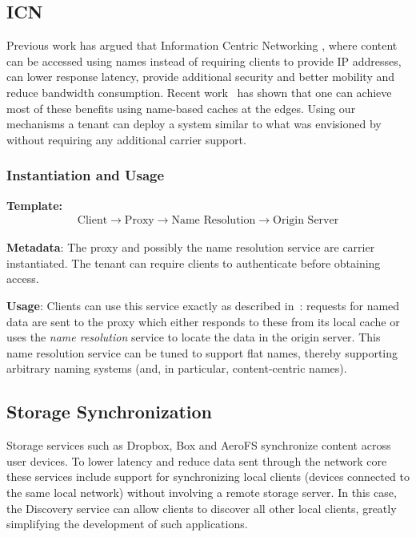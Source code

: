 \subsection{ICN}

Previous work has argued that Information Centric Networking \cite{ccn,dona}, where content can be accessed using names instead of requiring clients to provide IP addresses, can lower response latency, provide additional security and better mobility and reduce bandwidth consumption. Recent work~\cite{fayazbakhsh2013less} has shown that one can achieve most of these benefits using name-based caches at the edges. Using our mechanisms a tenant can deploy a system similar to what was envisioned by~\cite{fayazbakhsh2013less} without requiring any additional carrier support.

\subsubsection*{Instantiation and Usage}
\indent\indent\textbf{Template:} 
\begin{align*}
\text{Client} \rightarrow \text{Proxy} \rightarrow \text{Name Resolution} \rightarrow \text{Origin Server}
\end{align*}

\textbf{Metadata}: The proxy and possibly the name resolution service are carrier instantiated. The tenant can require clients to authenticate before obtaining access.

\textbf{Usage}: Clients can use this service exactly as described in~\cite{fayazbakhsh2013less}: requests for named data are sent to the proxy which either responds to these from its local cache or uses the \emph{name resolution} service to locate the data in the origin server. This name resolution service can be tuned to support flat names, thereby supporting arbitrary naming systems (and, in particular, content-centric names).

\subsection{Storage Synchronization}

Storage services such as Dropbox, Box and AeroFS synchronize content across user devices. To lower latency and reduce data sent through the network core these services include support for synchronizing local clients (\ie devices connected to the same local network) without involving a remote storage server. In this case, the Discovery service can allow clients to discover all other local clients, greatly simplifying the development of such applications.

